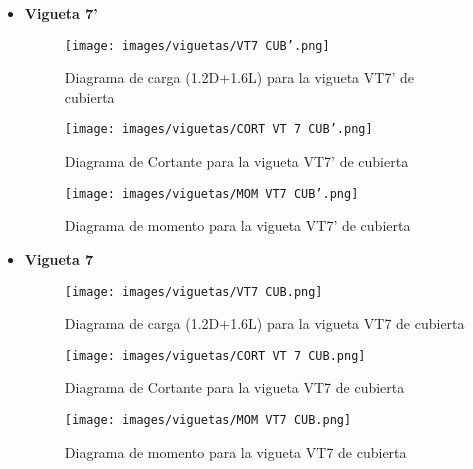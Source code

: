 \begin{itemize}
            \item \textbf{Vigueta 7'}\\
        \begin{figure}[H]
                \centering
                \texttt{[image: images/viguetas/VT7 CUB'.png]} 
                \caption{Diagrama de carga (1.2D+1.6L) para la vigueta VT7' de cubierta}
                \label{fig:W VT7' CUB}
            \end{figure}
            
            \begin{figure}[H]
                \centering
                \texttt{[image: images/viguetas/CORT VT 7 CUB'.png]}
                \caption{Diagrama de Cortante para la vigueta VT7' de cubierta}
                \label{fig:v VT7' CUB}
            \end{figure}
            
             \begin{figure}[H]
                \centering
                \texttt{[image: images/viguetas/MOM VT7 CUB'.png]} 
                \caption{Diagrama de momento para la vigueta VT7' de cubierta}
                \label{fig:M VT7' CUB}
            \end{figure}
            
            
               \item \textbf{Vigueta 7}\\
        \begin{figure}[H]
                \centering
                \texttt{[image: images/viguetas/VT7 CUB.png]} 
                \caption{Diagrama de carga (1.2D+1.6L) para la vigueta VT7 de cubierta}
                \label{fig:W VT7 CUB}
            \end{figure}
            
            \begin{figure}[H]
                \centering
                \texttt{[image: images/viguetas/CORT VT 7 CUB.png]}
                \caption{Diagrama de Cortante para la vigueta VT7 de cubierta}
                \label{fig:v VT7 CUB}
            \end{figure}
            
             \begin{figure}[H]
                \centering
                \texttt{[image: images/viguetas/MOM VT7 CUB.png]} 
                \caption{Diagrama de momento para la vigueta VT7 de cubierta}
                \label{fig:M VT7 CUB}
            \end{figure}
            

\end{itemize}
